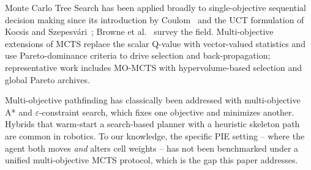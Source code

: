 Monte Carlo Tree Search has been applied broadly to single-objective sequential decision making since its introduction by Coulom~\cite{Coulom06} and the UCT formulation of Kocsis and Szepesv\'ari~\cite{KocsisS06}; Browne et al.~\cite{BrownePWLCRTPSC12} survey the field. Multi-objective extensions of MCTS replace the scalar Q-value with vector-valued statistics and use Pareto-dominance criteria to drive selection and back-propagation; representative work includes MO-MCTS with hypervolume-based selection and global Pareto archives.

Multi-objective pathfinding has classically been addressed with multi-objective A* and $\varepsilon$-constraint search, which fixes one objective and minimizes another. Hybrids that warm-start a search-based planner with a heuristic skeleton path are common in robotics. To our knowledge, the specific PIE setting -- where the agent both moves \emph{and} alters cell weights -- has not been benchmarked under a unified multi-objective MCTS protocol, which is the gap this paper addresses.
